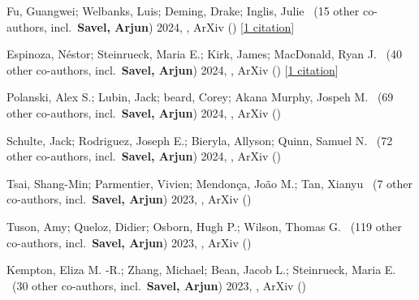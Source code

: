 \item[{\color{numcolor}\scriptsize9}] Fu, Guangwei; Welbanks, Luis; Deming, Drake; Inglis, Julie \etal\ ({15} other co-authors, incl.\ \textbf{Savel, Arjun}) 2024, , ArXiv () [\href{https://ui.adsabs.harvard.edu/abs/2024arXiv240706163F}{1 citation}]

\item[{\color{numcolor}\scriptsize8}] Espinoza, N{\'e}stor; Steinrueck, Maria E.; Kirk, James; MacDonald, Ryan J. \etal\ ({40} other co-authors, incl.\ \textbf{Savel, Arjun}) 2024, , ArXiv () [\href{https://ui.adsabs.harvard.edu/abs/2024arXiv240710294E}{1 citation}]

\item[{\color{numcolor}\scriptsize7}] Polanski, Alex S.; Lubin, Jack; beard, Corey; Akana Murphy, Jospeh M. \etal\ ({69} other co-authors, incl.\ \textbf{Savel, Arjun}) 2024, , ArXiv ()

\item[{\color{numcolor}\scriptsize6}] Schulte, Jack; Rodriguez, Joseph E.; Bieryla, Allyson; Quinn, Samuel N. \etal\ ({72} other co-authors, incl.\ \textbf{Savel, Arjun}) 2024, , ArXiv ()

\item[{\color{numcolor}\scriptsize5}] Tsai, Shang-Min; Parmentier, Vivien; Mendon{\c{c}}a, Jo{\~a}o M.; Tan, Xianyu \etal\ ({7} other co-authors, incl.\ \textbf{Savel, Arjun}) 2023, , ArXiv ()

\item[{\color{numcolor}\scriptsize4}] Tuson, Amy; Queloz, Didier; Osborn, Hugh P.; Wilson, Thomas G. \etal\ ({119} other co-authors, incl.\ \textbf{Savel, Arjun}) 2023, , ArXiv ()

\item[{\color{numcolor}\scriptsize3}] Kempton, Eliza M. -R.; Zhang, Michael; Bean, Jacob L.; Steinrueck, Maria E. \etal\ ({30} other co-authors, incl.\ \textbf{Savel, Arjun}) 2023, , ArXiv ()

